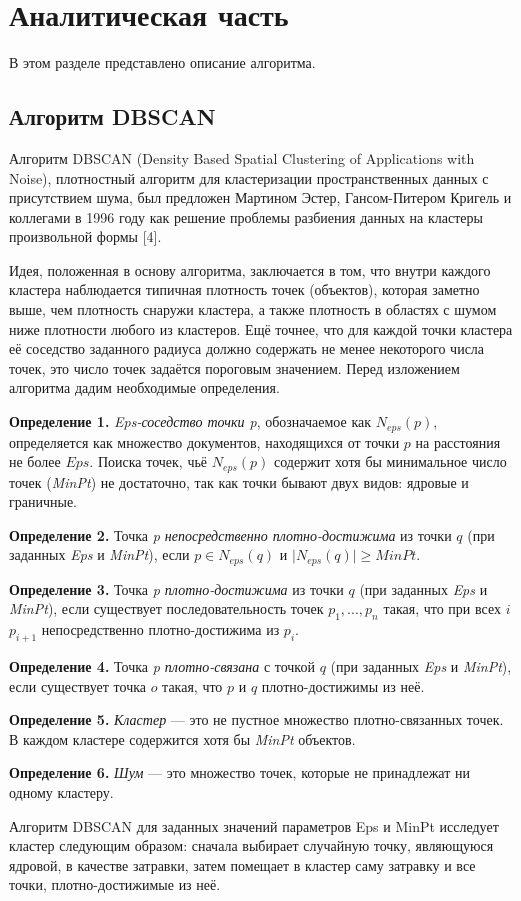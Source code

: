 \chapter{Аналитическая часть}
В этом разделе представлено описание алгоритма.

\section{Алгоритм DBSCAN}
Алгоритм DBSCAN (Density Based Spatial Clustering of Applications with Noise), плотностный алгоритм для кластеризации пространственных данных с присутствием шума, был предложен Мартином Эстер, Гансом-Питером Кригель и коллегами в 1996 году как решение проблемы разбиения данных на кластеры произвольной формы [4].

Идея, положенная в основу алгоритма, заключается в том, что внутри каждого кластера наблюдается типичная плотность точек (объектов), которая заметно выше, чем плотность снаружи кластера, а также плотность в областях с шумом ниже плотности любого из кластеров. 
Ещё точнее, что для каждой точки кластера её соседство заданного радиуса должно содержать не менее некоторого числа точек, это число точек задаётся пороговым значением.
Перед изложением алгоритма дадим необходимые определения.

\textbf{Определение 1.} \emph{Eps-соседство точки p}, обозначаемое как $N_{eps}(p)$, определяется как множество документов, находящихся от точки $p$ на расстояния не более $Eps$.
Поиска точек, чьё $N_{eps}(p)$ содержит хотя бы минимальное число точек (\emph{MinPt}) не достаточно, так как точки бывают двух видов: ядровые и граничные.

\textbf{Определение 2.} Точка \emph{p непосредственно плотно-достижима} из точки $q$ (при
заданных \emph{Eps} и \emph{MinPt}), если $p \in N_{eps}(q)$ и $\vert N_{eps}(q) \vert \ge MinPt.$

\textbf{Определение 3.} Точка \emph{p плотно-достижима} из точки $q$ (при
заданных \emph{Eps} и \emph{MinPt}), если существует последовательность точек $p_1, ..., p_n$ такая, что при всех $i$ $p_{i+1}$ непосредственно плотно-достижима из $p_i.$

\textbf{Определение 4.} Точка \emph{p плотно-связана} с точкой $q$ (при
заданных \emph{Eps} и \emph{MinPt}), если существует точка $o$ такая, что $p$ и $q$ плотно-достижимы из неё.

\textbf{Определение 5.} \emph{Кластер} --- это не пустное множество плотно-связанных точек. В каждом кластере содержится хотя бы \emph{MinPt} объектов.

\textbf{Определение 6.} \emph{Шум} --- это множество точек, которые не принадлежат ни одному кластеру.

Алгоритм DBSCAN для заданных значений параметров Eps и MinPt исследует кластер следующим образом: сначала выбирает случайную точку, являющуюся ядровой, в качестве затравки, затем помещает в кластер саму затравку и все точки, плотно-достижимые из неё.

